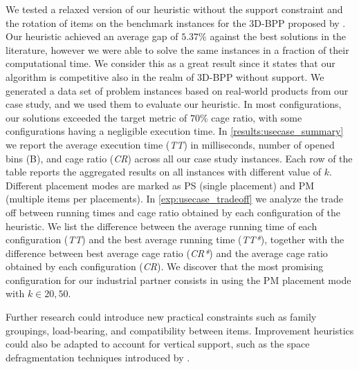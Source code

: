 \documentclass[11pt,a4paper,twocolumn]{article}
\begin{document}
We tested a relaxed version of our heuristic without the support constraint and the rotation of items on the benchmark instances for the 3D-BPP proposed by \cite{martello2000three}.
Our heuristic achieved an average gap of $5.37\%$ against the best solutions in the literature, however we were able to solve the same instances in a fraction of their computational time.
We consider this as a great result since it states that our algorithm is competitive also in the realm of 3D-BPP without support.
We generated a data set of problem instances based on real-world products from our case study, and we used them to evaluate our heuristic.
In most configurations, our solutions exceeded the target metric of $70\%$ cage ratio, with some configurations having a negligible execution time.
In \cref{results:usecase_summary} we report the average execution time (\textit{TT}) in milliseconds, number of opened bins (B), and cage ratio (\textit{CR}) across all our case study instances. Each row of the table reports the aggregated results on all instances with different value of $k$.
Different placement modes are marked as PS (single placement) and PM (multiple items per placements).
In \cref{exp:usecase_tradeoff} we analyze the trade off between running times and cage ratio obtained by each configuration of the heuristic.
We list the difference between the average running time of each configuration (\textit{TT}) and the best average running time (\textit{TT*}), together with the difference between best average cage ratio (\textit{CR*}) and the average cage ratio obtained by each configuration (\textit{CR}).
We discover that the most promising configuration for our industrial partner consists in using the PM placement mode with $k \in {20, 50}$.

Further research could introduce new practical constraints such as family groupings, load-bearing, and compatibility between items.
Improvement heuristics could also be adapted to account for vertical support, such as the space defragmentation techniques introduced by \cite{ZHU2012452}.



\end{document}
